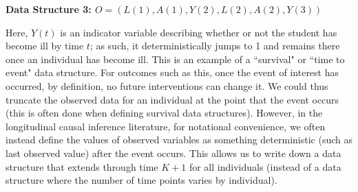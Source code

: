 \documentclass[answers]{exam}
\newenvironment{myfigure}{\captionsetup{type=mytype}}{}
\begin{document}
\begin{solution}

\end{solution}


\noindent\large\textbf{Data Structure 3: $O = (L(1), A(1), Y(2), L(2), A(2), Y(3))$}
\normalsize


Here, $Y(t)$ is an indicator variable describing whether or not the student has become ill by time $t$; as such, it deterministically jumps to 1 and remains there once an individual has become ill. This is an example of a ``survival" or ``time to event" data structure.  For outcomes such as this, once the event of interest has occurred, by definition, no future interventions can change it. We could thus truncate the observed data for an individual at the point that the event occurs (this is often done when defining survival data structures). However, in the longitudinal causal inference literature, for notational convenience, we often instead define the values of observed variables as something deterministic (such as last observed value) after the event occurs. This allows us to write down a data structure that extends through time $K+1$ for all individuals (instead of a data structure where the number of time points varies by individual).
\end{document}
